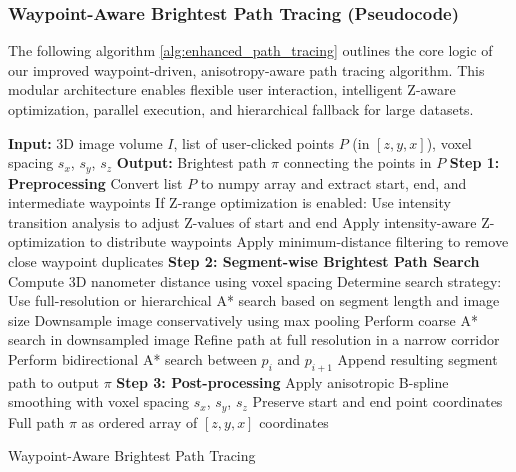 \subsubsection{\textbf{Waypoint-Aware Brightest Path Tracing (Pseudocode)}}

The following algorithm  \ref{alg:enhanced_path_tracing} outlines the core logic of our improved waypoint-driven, anisotropy-aware path tracing algorithm. This modular architecture enables flexible user interaction, intelligent Z-aware optimization, parallel execution, and hierarchical fallback for large datasets.

\begin{algorithm}[htb]
\footnotesize
\begin{algorithmic}[1]
    \State \textbf{Input:} 3D image volume $I$, list of user-clicked points $P$ (in $[z, y, x]$), voxel spacing $s_x$, $s_y$, $s_z$
    \State \textbf{Output:} Brightest path $\pi$ connecting the points in $P$
    \State 
    \State \textbf{Step 1: Preprocessing}
    \State Convert list $P$ to numpy array and extract start, end, and intermediate waypoints
    \State If Z-range optimization is enabled:
    \State \hspace{1em} Use intensity transition analysis to adjust Z-values of start and end
    \State \hspace{1em} Apply intensity-aware Z-optimization to distribute waypoints
    \State Apply minimum-distance filtering to remove close waypoint duplicates
    \State 
    \State \textbf{Step 2: Segment-wise Brightest Path Search}
        \State Compute 3D nanometer distance using voxel spacing
        \State Determine search strategy:
        \State \hspace{1em} Use full-resolution or hierarchical A* search based on segment length and image size
            \State Downsample image conservatively using max pooling
            \State Perform coarse A* search in downsampled image
            \State Refine path at full resolution in a narrow corridor
        \Else
            \State Perform bidirectional A* search between $p_i$ and $p_{i+1}$
        \EndIf
        \State Append resulting segment path to output $\pi$
    \EndFor
    \State 
    \State \textbf{Step 3: Post-processing}
        \State Apply anisotropic B-spline smoothing with voxel spacing $s_x$, $s_y$, $s_z$
        \State Preserve start and end point coordinates
    \EndIf
    \State 
    \State \Return Full path $\pi$ as ordered array of $[z, y, x]$ coordinates
\end{algorithmic}
\caption{Waypoint-Aware Brightest Path Tracing}
\label{alg:enhanced_path_tracing}
\end{algorithm}

